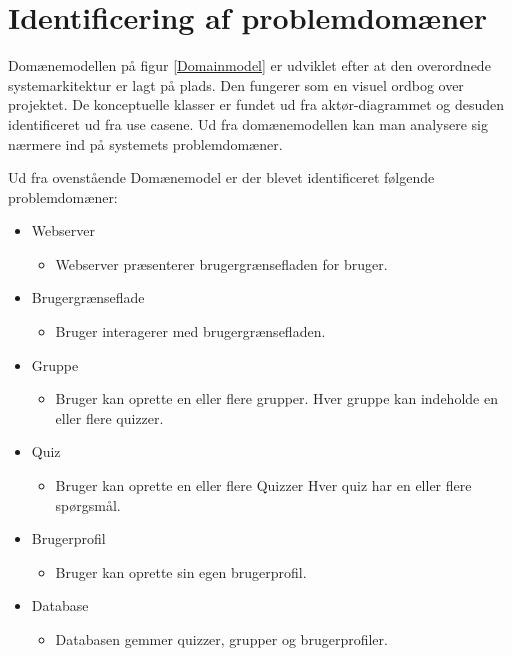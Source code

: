 \chapter{Identificering af problemdomæner}

Domænemodellen på figur \ref{Domainmodel} er udviklet efter at den overordnede systemarkitektur er lagt på plads. Den fungerer som en visuel ordbog over projektet. De konceptuelle klasser er fundet ud fra aktør-diagrammet og desuden identificeret ud fra use casene. Ud fra domænemodellen kan man analysere sig nærmere ind på systemets problemdomæner.


Ud fra ovenstående Domænemodel er der blevet identificeret følgende problemdomæner:

\begin{itemize}
	\item Webserver
	\begin{itemize}
		\item Webserver præsenterer brugergrænsefladen for bruger.
	\end{itemize}
	\item Brugergrænseflade
	\begin{itemize}
		\item Bruger interagerer med brugergrænsefladen.
	\end{itemize}
		\item Gruppe
	\begin{itemize}
		\item Bruger kan oprette en eller flere grupper. Hver gruppe kan indeholde en eller flere quizzer.
	\end{itemize}
		\item Quiz
	\begin{itemize}
		\item Bruger kan oprette en eller flere Quizzer Hver quiz har en eller flere spørgsmål.
	\end{itemize}
		\item Brugerprofil
	\begin{itemize}
		\item Bruger kan oprette sin egen brugerprofil.
	\end{itemize}
	\item Database
	\begin{itemize}
		\item Databasen gemmer quizzer, grupper og brugerprofiler.
	\end{itemize}
\end{itemize}